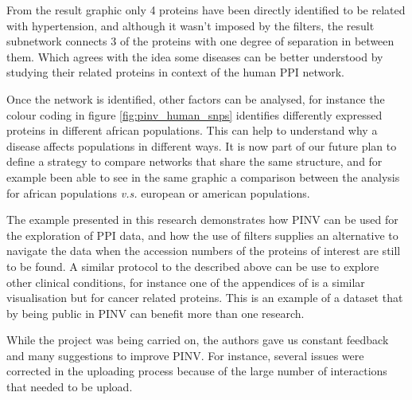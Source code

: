 From the result graphic only 4 proteins have been directly identified to be related with hypertension, and although it wasn't  imposed by the filters, the result subnetwork connects 3 of the proteins with one degree of separation in between them. Which agrees with the idea some diseases can be better understood by studying their related proteins in context of the human PPI network.

Once the network is identified, other factors can be analysed, for instance the colour coding in figure \ref{fig:pinv_human_snps} identifies differently expressed proteins in different african populations. This can help to understand why a disease affects populations in different ways. It is now part of our future plan to define a strategy to compare networks that share the same structure, and for example been able to see in the same graphic a comparison between the analysis for african populations \emph{v.s.} european or american populations. 

The example presented in this research demonstrates how PINV can be used for the exploration of PPI data, and how the use of filters supplies an alternative to navigate the data when the accession numbers of the proteins of interest are still to be found. A similar protocol to the described above can be use to explore other clinical conditions, for instance one of the appendices of \cite{HEE2014} is a similar visualisation but for cancer related proteins. This is an example of a dataset that by being public in PINV can benefit more than one research.

While the project was being carried on, the authors gave us constant feedback and many suggestions to improve PINV. For instance, several issues were corrected in the uploading process because of the large number of interactions that needed to be upload.



